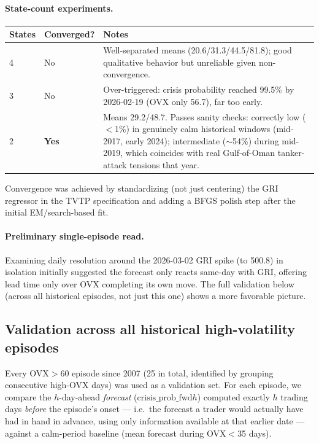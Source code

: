 \documentclass[11pt]{article}
\begin{document}
\paragraph{State-count experiments.}
\begin{center}
\begin{tabular}{lll}
\toprule
States & Converged? & Notes \\
\midrule
4 & No & Well-separated means (20.6/31.3/44.5/81.8); good qualitative behavior but unreliable given non-convergence. \\
3 & No & Over-triggered: crisis probability reached 99.5\% by 2026-02-19 (OVX only 56.7), far too early. \\
2 & \textbf{Yes} & Means 29.2/48.7. Passes sanity checks: correctly low ($<$1\%) in genuinely calm historical windows (mid-2017, early 2024); intermediate ($\sim$54\%) during mid-2019, which coincides with real Gulf-of-Oman tanker-attack tensions that year. \\
\bottomrule
\end{tabular}
\end{center}

Convergence was achieved by standardizing (not just centering) the GRI
regressor in the TVTP specification and adding a BFGS polish step after the
initial EM/search-based fit.

\paragraph{Preliminary single-episode read.} Examining daily resolution
around the 2026-03-02 GRI spike (to 500.8) in isolation initially suggested
the forecast only reacts same-day with GRI, offering lead time only over
OVX completing its own move. The full validation below (across all
historical episodes, not just this one) shows a more favorable picture.

\subsection{Validation across all historical high-volatility episodes}
Every OVX$>$60 episode since 2007 (25 in total, identified by grouping
consecutive high-OVX days) was used as a validation set. For each episode,
we compare the $h$-day-ahead \emph{forecast} ($\text{crisis\_prob\_fwd}h$)
computed exactly $h$ trading days \emph{before} the episode's onset ---
i.e.\ the forecast a trader would actually have had in hand in advance,
using only information available at that earlier date --- against a
calm-period baseline (mean forecast during OVX$<$35 days).
\end{document}
